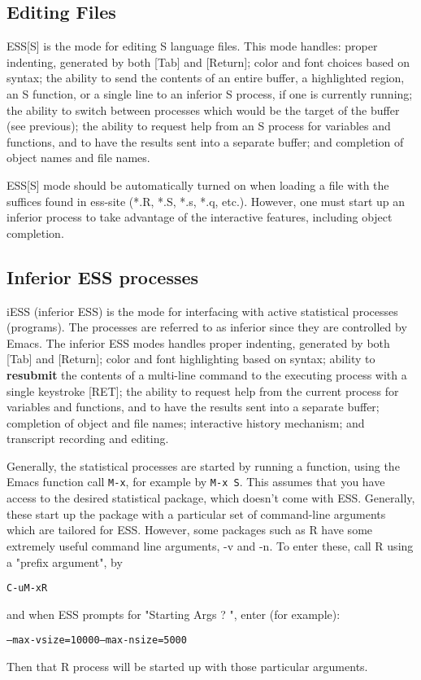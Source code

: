 \documentclass{article}
\newenvironment{Salltt}{\small\begin{alltt}}{\end{alltt}}
\begin{document}
\subsection{Editing Files}
\label{sec:S:edit}

ESS[S] is the mode for editing S language files.  This mode handles:
proper indenting, generated by both [Tab] and [Return]; color and font
choices based on syntax; the ability to send the contents of an entire
buffer, a highlighted region, an S function, or a single line to an
inferior S process, if one is currently running; the ability to switch
between processes which would be the target of the buffer (see
previous); the ability to request help from an S process for variables
and functions, and to have the results sent into a separate buffer;
and completion of object names and file names.

ESS[S] mode should be automatically turned on when loading a file with
the suffices found in ess-site (*.R, *.S, *.s, *.q, etc.).  However,
one must start up an inferior process to take advantage of the
interactive features, including object completion.

\subsection{Inferior ESS processes}
\label{sec:S:inf}

iESS (inferior ESS) is the mode for interfacing with active
statistical processes (programs).  The processes are referred to as
inferior since they are controlled by Emacs.  The inferior ESS modes
handles proper indenting, generated by both [Tab] and [Return]; color
and font highlighting based on syntax; ability to \textbf{resubmit}
the contents of a multi-line command to the executing process with a
single keystroke [RET]; the ability to request help from the current
process for variables and functions, and to have the results sent into
a separate buffer; completion of object and file names; interactive
history mechanism; and transcript recording and editing.

Generally, the statistical processes are started by running a
function, using the Emacs function call \verb+M-x+, for example by
\verb|M-x S|.  This assumes that you have access to the desired
statistical package, which doesn't come with ESS.  Generally, these
start up the package with a particular set of command-line arguments
which are tailored for ESS.  However, some packages such as R have
some extremely useful command line arguments, -v and -n.  To enter
these, call R using a "prefix argument", by
\begin{Salltt}
   C-u M-x R
\end{Salltt}
and when ESS prompts for "Starting Args ? ", enter (for example):
\begin{Salltt}
   --max-vsize=10000 --max-nsize=5000
\end{Salltt}
Then that R process will be started up with those particular arguments.
\end{document}
